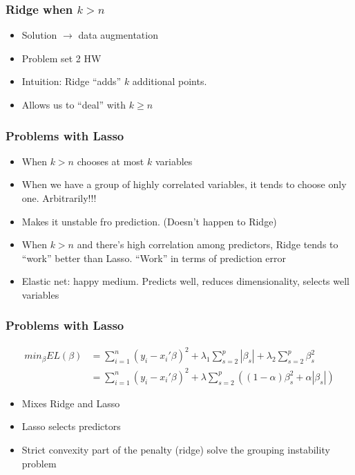\documentclass[
  shownotes,
  xcolor={svgnames},
  hyperref={colorlinks,citecolor=DarkBlue,linkcolor=DarkRed,urlcolor=DarkBlue}
  , aspectratio=169]{beamer}
\begin{document}
\begin{frame}[fragile]
\frametitle{Ridge when $k>n$}


\begin{itemize}
  \item Solution $\rightarrow$ data augmentation
  \item Problem set 2 HW
  \item Intuition: Ridge ``adds'' $k$ additional points.
  \item Allows us to ``deal'' with $k\geq n$
\end{itemize}

\end{frame}
\begin{frame}[fragile]
\frametitle{Problems with Lasso}

\begin{itemize}
\item When $k>n$ chooses at most $k$ variables
\item When we have a group of highly correlated variables, it tends to choose only one. Arbitrarily!!!
\item Makes it unstable fro prediction. (Doesn't happen to Ridge)
\item When $k>n$ and there's high correlation among predictors, Ridge tends to ``work'' better than Lasso. ``Work'' in terms of prediction error
\item Elastic net: happy medium. Predicts well, reduces dimensionality, selects well variables
\end{itemize}



\end{frame}
\begin{frame}[fragile]
\frametitle{Problems with Lasso}



\begin{align}
min_{\beta} EL(\beta) &= \sum_{i=1}^n (y_i-x_i'\beta)^2 + \lambda_1 \sum_{s=2}^p |\beta_s| + \lambda_2 \sum_{s=2}^p \beta_s^2 \nonumber \\
 &= \sum_{i=1}^n (y_i-x_i'\beta)^2 + \lambda \sum_{s=2}^p \left(  (1-\alpha) \beta_s^2 + \alpha  |\beta_s|\right)
\end{align}


\begin{itemize}
 \item Mixes Ridge and Lasso
 \item Lasso selects predictors
 \item Strict convexity part  of the penalty (ridge) solve the grouping instability problem 
\end{itemize}


\end{frame}
\end{document}
